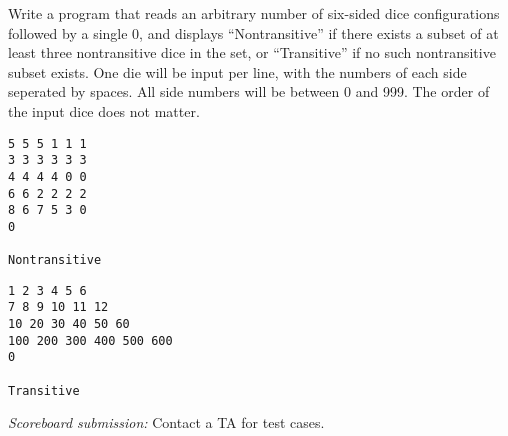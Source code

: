 \documentclass[11pt]{cselabheader}
\theoremstyle{plain}
\begin{document}
\begin{enumerate}
    Write a program that reads an arbitrary number of six-sided dice
    configurations followed by a single 0, and displays
    ``Nontransitive'' if there exists a subset of at least three
    nontransitive dice in the set, or ``Transitive'' if no such
    nontransitive subset exists. One die will be input per line,
    with the numbers of each side seperated by spaces. All side
    numbers will be between 0 and 999. The order of the input dice
    does not matter.

    \begin{minipage}{.5\linewidth}
      \begin{minipage}{.9\linewidth}
        \begin{lstlisting}[style=bash]
5 5 5 1 1 1
3 3 3 3 3 3
4 4 4 4 0 0
6 6 2 2 2 2
8 6 7 5 3 0
0

Nontransitive
        \end{lstlisting}
      \end{minipage}
    \end{minipage}
    \begin{minipage}{.5\linewidth}
      \begin{minipage}{.9\linewidth}
        \begin{lstlisting}[style=bash]
1 2 3 4 5 6
7 8 9 10 11 12
10 20 30 40 50 60
100 200 300 400 500 600
0

Transitive
        \end{lstlisting}
      \end{minipage}
    \end{minipage}

    \textit{Scoreboard submission:} Contact a TA for test cases.
\end{enumerate}
\pagebreak
\end{document}
